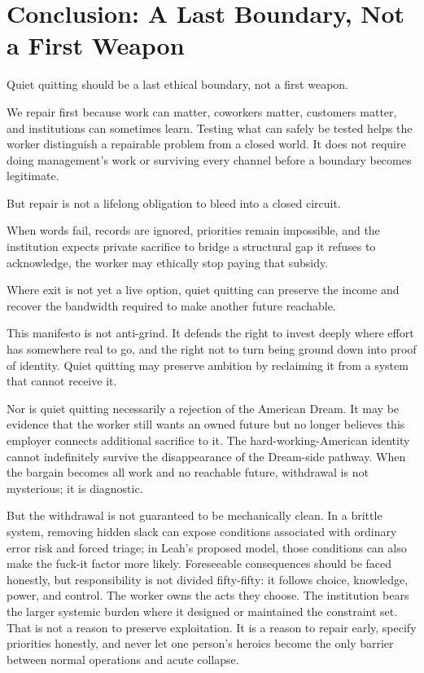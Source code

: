 \documentclass[11pt,oneside]{article}
\begin{document}
\hypertarget{conclusion-a-last-boundary-not-a-first-weapon}{%
\section{Conclusion: A Last Boundary, Not a First
Weapon}\label{conclusion-a-last-boundary-not-a-first-weapon}}

Quiet quitting should be a last ethical boundary, not a first weapon.

We repair first because work can matter, coworkers matter, customers
matter, and institutions can sometimes learn. Testing what can safely be
tested helps the worker distinguish a repairable problem from a closed
world. It does not require doing management's work or surviving every
channel before a boundary becomes legitimate.

But repair is not a lifelong obligation to bleed into a closed circuit.

When words fail, records are ignored, priorities remain impossible, and
the institution expects private sacrifice to bridge a structural gap it
refuses to acknowledge, the worker may ethically stop paying that
subsidy.

Where exit is not yet a live option, quiet quitting can preserve the
income and recover the bandwidth required to make another future
reachable.

This manifesto is not anti-grind. It defends the right to invest deeply
where effort has somewhere real to go, and the right not to turn being
ground down into proof of identity. Quiet quitting may preserve ambition
by reclaiming it from a system that cannot receive it.

Nor is quiet quitting necessarily a rejection of the American Dream. It
may be evidence that the worker still wants an owned future but no
longer believes this employer connects additional sacrifice to it. The
hard-working-American identity cannot indefinitely survive the
disappearance of the Dream-side pathway. When the bargain becomes all
work and no reachable future, withdrawal is not mysterious; it is
diagnostic.

But the withdrawal is not guaranteed to be mechanically clean. In a
brittle system, removing hidden slack can expose conditions associated
with ordinary error risk and forced triage; in Leah's proposed model,
those conditions can also make the fuck-it factor more likely.
Foreseeable consequences should be faced honestly, but responsibility is
not divided fifty-fifty: it follows choice, knowledge, power, and
control. The worker owns the acts they choose. The institution bears the
larger systemic burden where it designed or maintained the constraint
set. That is not a reason to preserve exploitation. It is a reason to
repair early, specify priorities honestly, and never let one person's
heroics become the only barrier between normal operations and acute
collapse.
\end{document}
